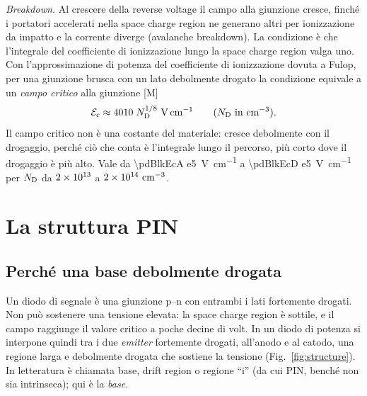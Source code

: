 \documentclass[10pt,a4paper]{scrartcl}
\let\newcommand\pdvaluedefine
\newcommand{\Ec}{\mathcal{E}_\mathrm{c}}      %
\newcommand{\ND}{N_\mathrm{D}}
\newcommand{\Pp}{p\textsuperscript{+}}
\newcommand{\Nm}{n\textsuperscript{--}}
\newcommand{\Np}{n\textsuperscript{+}}
\newcommand{\cmc}{\si{\centi\metre^{-3}}}
\begin{document}
\emph{Breakdown.} Al crescere della reverse voltage il campo alla giunzione cresce, finché i portatori accelerati nella space charge region ne generano altri per ionizzazione da impatto e la corrente diverge (avalanche breakdown). La condizione è che l'integrale del coefficiente di ionizzazione lungo la space charge region valga uno. Con l'approssimazione di potenza del coefficiente di ionizzazione dovuta a Fulop, per una giunzione brusca con un lato debolmente drogato la condizione equivale a un \emph{campo critico} alla giunzione [M] \cite{baliga}
\begin{equation}
\Ec \approx 4010\;\ND^{1/8}\ \si{\volt\per\centi\metre} \qquad (\ND\ \text{in}\ \cmc) .
\label{eq:ecrit}
\end{equation}
Il campo critico non è una costante del materiale: cresce debolmente con il drogaggio, perché ciò che conta è l'integrale lungo il percorso, più corto dove il drogaggio è più alto. Vale da \SI{\pdBlkEcA e5}{\volt\per\centi\metre} a \SI{\pdBlkEcD e5}{\volt\per\centi\metre} per $\ND$ da $2\times10^{13}$ a $\pdBlkNdD\ \cmc$.

\section{La struttura PIN}
\label{sec:pin}
\subsection{Perché una base debolmente drogata}
\label{sec:why}
Un diodo di segnale è una giunzione p--n con entrambi i lati fortemente drogati. Non può sostenere una tensione elevata: la space charge region è sottile, e il campo raggiunge il valore critico a poche decine di volt. In un diodo di potenza si interpone quindi tra i due \emph{emitter} fortemente drogati, \Pp{} all'anodo e \Np{} al catodo, una regione \Nm{} larga e debolmente drogata che sostiene la tensione (Fig.~\ref{fig:structure}). In letteratura è chiamata base, drift region o regione ``i'' (da cui PIN, benché non sia intrinseca); qui è la \emph{base}.
\end{document}
